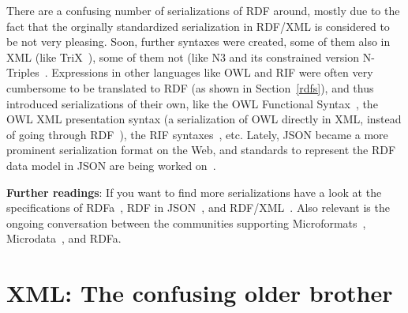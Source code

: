 There are a confusing number of serializations of RDF around, mostly due to the fact that the orginally standardized serialization in RDF/XML is considered to be not very pleasing.
Soon, further syntaxes were created, some of them also in XML (like TriX~\cite{trix}), some of them not (like N3 and its constrained version N-Triples~\cite{ntriples}.
Expressions in other languages like OWL and RIF were often very cumbersome to be translated to RDF (as shown in Section~\ref{rdfs}), and thus introduced serializations of their own, like the OWL Functional Syntax~\cite{owl2}, the OWL XML presentation syntax (a serialization of OWL directly in XML, instead of going through RDF~\cite{owl3}), the RIF syntaxes~\cite{rif}, etc.
Lately, JSON became a more prominent serialization format on the Web, and standards to represent the RDF data model in JSON are being worked on~\cite{json-ld}.



\medskip

\textbf{Further readings}:
If you want to find more serializations have a look at the specifications of RDFa~\cite{rdfa}, RDF in JSON~\cite{json-ld}, and RDF/XML~\cite{rdfxml}.
Also relevant is the ongoing conversation between the communities supporting Microformats~\cite{microformats}, Microdata~\cite{microdata}, and RDFa.

\section{XML: The confusing older brother}
\label{xml}

